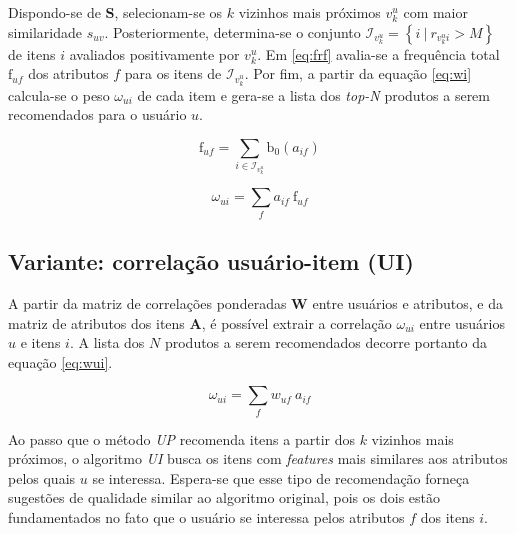 Dispondo-se de $\mathbf{S}$, selecionam-se os $k$ vizinhos mais próximos $v_k^u$ com maior similaridade $s_{uv}$.  Posteriormente, determina-se o conjunto $\mathcal{I}_{v_k^u} = \left\{ i ~|~ r_{v_k^u i} > M\right\}$ de itens $i$ avaliados positivamente por $v_k^u$. Em \ref{eq:frf} avalia-se a frequência total $\mathrm{f}_{uf}$ dos atributos $f$ para os itens de $\mathcal{I}_{v_k^u}$. Por fim, a partir da equação \ref{eq:wi} calcula-se o peso $\omega_{ui}$ de cada item e gera-se a lista dos \textit{top-N} produtos a serem recomendados para o usuário $u$. 


\begin{equation}
\label{eq:frf} 
\mathrm{f}_{uf} = \sum_{i \in \mathcal{I}_{v_k^u}}{\mathrm{b}_0\left(a_{if}\right)}
\end{equation} 

\begin{equation}
\label{eq:wi} 
    \omega_{ui} = \sum_{f}{a_{if}~\mathrm{f}_{uf}}
\end{equation} 

\subsection{Variante: correlação usuário-item (UI)} %
\label{sub:variante_correla_o_usu_rio_item_}

A partir da matriz de correlações ponderadas $\mathbf{W}$ entre usuários e atributos, e da matriz de atributos dos itens $\mathbf{A}$, é possível extrair a correlação $\omega_{ui}$ entre usuários $u$ e itens $i$. A lista dos $N$ produtos a serem recomendados decorre portanto da equação \ref{eq:wui}.

\begin{equation}
\label{eq:wui} 
    \omega_{ui} = \sum_{f}{w_{uf}~a_{if}}
\end{equation} 

Ao passo que o método \textit{UP} recomenda itens a partir dos $k$ vizinhos mais próximos, o algoritmo \textit{UI} busca os itens com \textit{features} mais similares aos atributos pelos quais $u$ se interessa. Espera-se que esse tipo de recomendação forneça sugestões de qualidade similar ao algoritmo original, pois os dois estão fundamentados no fato que o usuário se interessa pelos atributos $f$ dos itens $i$. 


